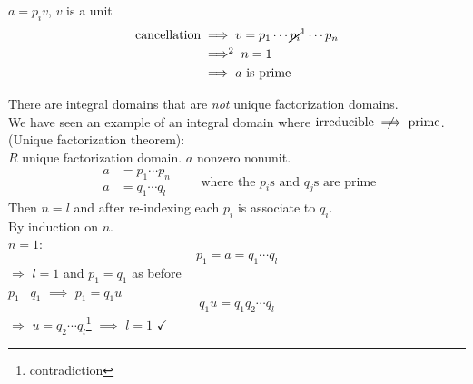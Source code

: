 $a=p_iv$, $v$ is a unit
\begin{align*}
\text{cancellation} &\implies v=p_1\dotsm\cancel{p_i}\footnotemark\dotsm p_n \\
&\mathrel{\;{\Longrightarrow}\footnotemark\;} n=1 \\
&\implies\text{$a$ is prime}
\end{align*}\addtocounter{footnote}{-1}\addtocounter{footnote}{1}%
\cor There are integral domains that are \emph{not} unique factorization domains. \\
\pf We have seen an example of an integral domain where $\text{irreducible}\centernot\implies\text{prime}$. \\
\thm (Unique factorization theorem): \\
$R$ unique factorization domain.  $a$ nonzero nonunit.
\begin{equation*}
\begin{aligned}
a &= p_1 \dotsm p_n \\
a &= q_1 \dotsm q_l
\end{aligned} \qquad \text{where the $p_i$s and $q_j$s are prime}
\end{equation*}
Then $n=l$ and after re-indexing each $p_i$ is associate to $q_i$. \\
\pf By induction on $n$. \\
$n=1$:
\[ p_1 = a = q_1\dotsm q_l \]
$\Longrightarrow$ $l=1$ and $p_1=q_1$ as before \\
$p_1\mid q_1$ $\implies$ $p_1=q_1u$ \\
\[ q_1u = q_1q_2\dotsm q_l \]
$\Longrightarrow$ $u=q_2\dotsm q_l$\footnote{contradiction} $\implies$ $l=1$ $\checkmark$

